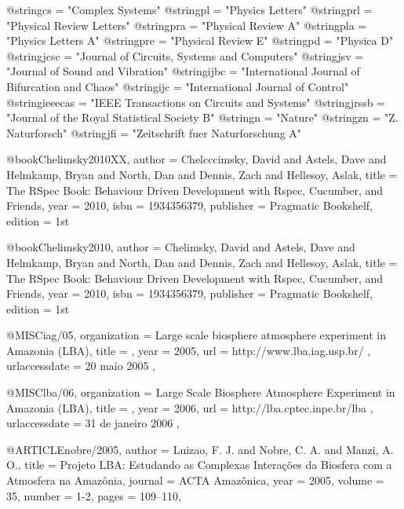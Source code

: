 
@string{cs =      "Complex Systems"}
@string{pl =      "Physics Letters"}
@string{prl =     "Physical Review Letters"}
@string{pra =     "Physical Review A"}
@string{pla =     "Physics Letters A"}
@string{pre =     "Physical Review E"}
@string{pd =      "Physica D"}
@string{jcsc =    "Journal of Circuits, Systems and Computers"}
@string{jsv =     "Journal of Sound and Vibration"}
@string{ijbc =    "International Journal of Bifurcation and Chaos"}
@string{ijc =     "International Journal of Control"}
@string{ieeecas = "IEEE Transactions on Circuits and Systems"}
@string{jrssb =   "Journal of the Royal Statistical Society B"}
@string{n =       "Nature"}
@string{zn =      "Z. Naturforsch"}
@string{jfi =     "Zeitschrift fuer Naturforschung A"}


@book{Chelimsky2010XX,
author = {Chelcccimsky, David and Astels, Dave and Helmkamp, Bryan and North, Dan and Dennis, Zach and Hellesoy, Aslak},
title = {The RSpec Book: Behaviour Driven Development with Rspec, Cucumber, and Friends},
year = {2010},
isbn = {1934356379},
publisher = {Pragmatic Bookshelf},
edition = {1st}
}

@book{Chelimsky2010,
author = {Chelimsky, David and Astels, Dave and Helmkamp, Bryan and North, Dan and Dennis, Zach and Hellesoy, Aslak},
title = {The RSpec Book: Behaviour Driven Development with Rspec, Cucumber, and Friends},
year = {2010},
isbn = {1934356379},
publisher = {Pragmatic Bookshelf},
edition = {1st}
}

@MISC{iag/05,
   organization = {Large scale biosphere atmosphere experiment in Amazonia (LBA)},
   title = {},
   year = {2005},
   url = { http://www.lba.iag.usp.br/ },
   urlaccessdate = { 20 maio 2005 },
}

@MISC{lba/06,
   organization = {Large Scale Biosphere Atmosphere Experiment in Amazonia (LBA)},
   title = {},  
   year = {2006},
   url = { http://lba.cptec.inpe.br/lba },
   urlaccessdate = { 31 de janeiro 2006 },
}

@ARTICLE{nobre/2005,
author 		= {Luizao, F. J. and Nobre, C. A. and Manzi, A. O.},
title		  = {Projeto LBA: Estudando as Complexas Intera{\c c}\~oes da Biosfera com a Atmosfera na Amaz\^onia},
journal 	= {ACTA Amaz\^onica},
year 			= {2005},
volume 		= {35},
number 		= {1-2},
pages 		= {109--110},
}


